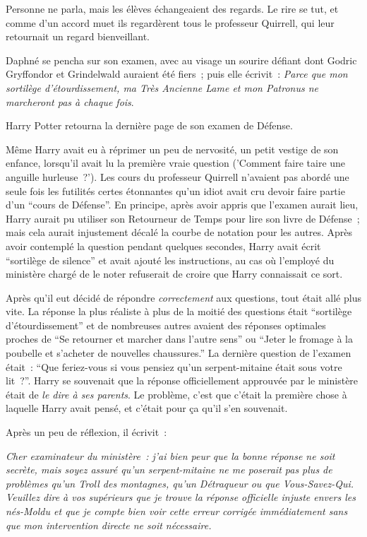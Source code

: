 Personne ne parla, mais les élèves échangeaient des regards. Le rire se tut, et comme d'un accord muet ils regardèrent tous le professeur Quirrell, qui leur retournait un regard bienveillant.

Daphné se pencha sur son examen, avec au visage un sourire défiant dont Godric Gryffondor et Grindelwald auraient été fiers~; puis elle écrivit~: \emph{Parce que mon sortilège d'étourdissement, ma Très Ancienne Lame et mon Patronus ne marcheront pas à chaque fois}.

\later

Harry Potter retourna la dernière page de son examen de Défense.

Même Harry avait eu à réprimer un peu de nervosité, un petit vestige de son enfance, lorsqu'il avait lu la première vraie question ('Comment faire taire une anguille hurleuse~?'). Les cours du professeur Quirrell n'avaient pas abordé une seule fois les futilités certes étonnantes qu'un idiot avait cru devoir faire partie d'un “cours de Défense”. En principe, après avoir appris que l'examen aurait lieu, Harry aurait pu utiliser son Retourneur de Temps pour lire son livre de Défense~; mais cela aurait injustement décalé la courbe de notation pour les autres. Après avoir contemplé la question pendant quelques secondes, Harry avait écrit “sortilège de silence” et avait ajouté les instructions, au cas où l'employé du ministère chargé de le noter refuserait de croire que Harry connaissait ce sort.

Après qu'il eut décidé de répondre \emph{correctement} aux questions, tout était allé plus vite. La réponse la plus réaliste à plus de la moitié des questions était “sortilège d'étourdissement” et de nombreuses autres avaient des réponses optimales proches de “Se retourner et marcher dans l'autre sens” ou “Jeter le fromage à la poubelle et s'acheter de nouvelles chaussures.”
La dernière question de l'examen était~: “Que feriez-vous si vous pensiez qu'un serpent-mitaine était sous votre lit~?”. Harry se souvenait que la réponse officiellement approuvée par le ministère était de \emph{le dire à ses parents}. Le problème, c'est que c'était la première chose à laquelle Harry avait pensé, et c'était pour ça qu'il s'en souvenait.

Après un peu de réflexion, il écrivit~:

\emph{Cher examinateur du ministère~: j'ai bien peur que la bonne réponse ne soit secrète, mais soyez assuré qu'un serpent-mitaine ne me poserait pas plus de problèmes qu'un Troll des montagnes, qu'un Détraqueur ou que Vous-Savez-Qui. Veuillez dire à vos supérieurs que je trouve la réponse officielle injuste envers les nés-Moldu et que je compte bien voir cette erreur corrigée immédiatement sans que mon intervention directe ne soit nécessaire.}

